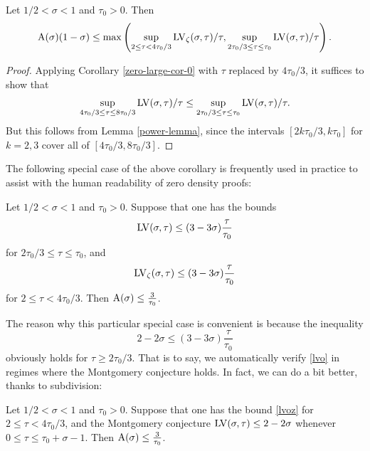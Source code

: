 \begin{corollary}\label{zero-large-cor} Let $1/2 < \sigma < 1$ and $\tau_0 > 0$.  Then
$$ \mathrm{A}(\sigma)(1-\sigma) \leq \max \left(\sup_{2 \leq \tau < 4\tau_0/3} \mathrm{LV}_\zeta(\sigma,\tau)/\tau, \sup_{2\tau_0/3 \leq \tau \leq \tau_0} \mathrm{LV}(\sigma,\tau)/\tau\right).$$
\end{corollary}


\begin{proof}  Applying Corollary \ref{zero-large-cor-0} with $\tau$ replaced by $4\tau_0/3$, it suffices to show that
$$\sup_{4\tau_0/3 \leq \tau \leq 8\tau_0/3} \mathrm{LV}(\sigma,\tau)/\tau \leq \sup_{2\tau_0/3 \leq \tau \leq \tau_0} \mathrm{LV}(\sigma,\tau)/\tau.$$
But this follows from Lemma \ref{power-lemma}, since the intervals $[2k\tau_0/3, k\tau_0]$ for $k=2,3$ cover all of $[4\tau_0/3,8\tau_0/3]$.
\end{proof}

The following special case of the above corollary is frequently used in practice to assist with the human readability of zero density proofs:

\begin{corollary}\label{zero-large-cor2} Let $1/2 < \sigma < 1$ and $\tau_0 > 0$.  Suppose that one has the bounds
\begin{equation}\label{lvo}
\mathrm{LV}(\sigma,\tau) \leq (3-3\sigma) \frac{\tau}{\tau_0}
\end{equation}
for $2\tau_0/3 \leq \tau \leq \tau_0$, and
\begin{equation}\label{lvoz}
 \mathrm{LV}_\zeta(\sigma,\tau) \leq (3-3\sigma) \frac{\tau}{\tau_0}
\end{equation}
for $2 \leq \tau < 4\tau_0/3$.  Then $\mathrm{A}(\sigma) \leq \frac{3}{\tau_0}$.
\end{corollary}

The reason why this particular special case is convenient is because the inequality
\begin{equation}\label{obvious}
    2 - 2\sigma \leq (3-3\sigma) \frac{\tau}{\tau_0}
\end{equation}
obviously holds for $\tau \geq 2\tau_0/3$.  That is to say, we automatically verify \eqref{lvo} in regimes where the Montgomery conjecture holds. In fact, we can do a bit better, thanks to subdivision:

\begin{corollary}\label{zero-large-cor3} Let $1/2 < \sigma < 1$ and $\tau_0 > 0$. Suppose that one has the bound \eqref{lvoz}
   for $2 \leq \tau < 4\tau_0/3$, and the Montgomery conjecture $\mathrm{LV}(\sigma,\tau) \leq 2-2\sigma$ whenever $0 \leq \tau \leq \tau_0+\sigma-1$.  Then $\mathrm{A}(\sigma) \leq \frac{3}{\tau_0}$.
\end{corollary}

